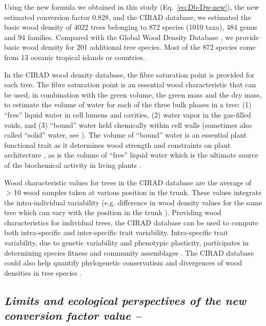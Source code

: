\documentclass[a4paper, 12pt, leqno, dvipsnames]{article}\usepackage[]{graphicx}\usepackage[]{color}
\begin{document}
Using the new formula we obtained in this study (Eq.~\ref{eq:Db-Dw-new}), the new estimated conversion factor 0.828, and the CIRAD database, we estimated the basic wood density of 4022 trees belonging to 872 species (1010 taxa), 484 genus and 94 families. Compared with the Global Wood Density Database \citep{Zanne2009}, we provide basic wood density for 201 additional tree species. Most of the 872 species come from 13 oceanic tropical islands or countries.

In the CIRAD wood density database, the fibre saturation point is provided for each tree. The fibre saturation point is an essential wood characteristic that can be used, in combination with the green volume, the green mass and the dry mass, to estimate the volume of water for each of the three bulk phases in a tree: (1) ``free'' liquid water in cell lumens and cavities, (2) water vapor in the gas-filled voids, and (3) ``bound'' water held chemically within cell walls (sometimes also called ``solid'' water, see \citet{Berry2005}). The volume of ``bound'' water is an essential plant functional trait as it determines wood strength and constraints on plant architecture \citep{Niklas1993}, as is the volume of ``free'' liquid water which is the ultimate source of the biochemical activity in living plants \citep{Berry2005}.

Wood characteristic values for trees in the CIRAD database are the average of $>$10 wood samples taken at various position in the trunk. These values integrate the intra-individual variability (e.g. difference in wood density values for the same tree which can vary with the position in the trunk \citep{Bastin2015}). Providing wood characteristics for individual trees, the CIRAD database can be used to compute both intra-specific and inter-specific trait variability. Intra-specific trait variability, due to genetic variability and phenotypic plasticity, participates in determining species fitness and community assemblages \citep{Courbaud2012, Albert2011, Roughgarden1979}. The CIRAD database could also help quantify phylogenetic conservatism and divergences of wood densities in tree species \citep{Flores2011}.

\subsection*{\textit{Limits and ecological perspectives of the new conversion factor value --}}
\end{document}
